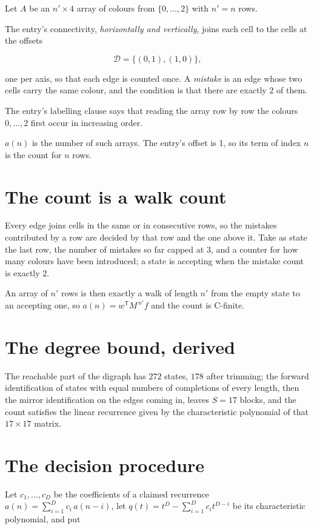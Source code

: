 \documentclass[11pt]{article}
\theoremstyle{definition}
\begin{document}
Let $A$ be an $n' \times 4$ array of colours from $\{0,\dots,2\}$ with $n' = n$ rows.

The entry's connectivity, {\itshape horizontally and vertically}, joins each cell to the cells at the offsets

\[\mathcal{D} = \{(0,1), (1,0)\},\]

one per axis, so that each edge is counted once. A {\itshape mistake} is an edge whose two cells carry the same colour, and the condition is that there are exactly $2$ of them.

The entry's labelling clause says that reading the array row by row the colours $0,\dots,2$ first occur in increasing order.

$a(n)$ is the number of such arrays. The entry's offset is 1, so its term of index $n$ is the count for $n$ rows.

\section{The count is a walk count}

Every edge joins cells in the same or in consecutive rows, so the mistakes contributed by a row are decided by that row and the one above it. Take as state the last row, the number of mistakes so far capped at $3$, and a counter for how many colours have been introduced; a state is accepting when the mistake count is exactly $2$.

An array of $n'$ rows is then exactly a walk of length $n'$ from the empty state to an accepting one, so $a(n) = w^{\mathsf T}M^{\,n'}f$ and the count is C-finite.

\section{The degree bound, derived}

The reachable part of the digraph has $272$ states, $178$ after trimming; the forward identification of states with equal numbers of completions of every length, then the mirror identification on the edges coming in, leaves $S = 17$ blocks, and the count satisfies the linear recurrence given by the characteristic polynomial of that $17\times17$ matrix.

\section{The decision procedure}

Let $c_1,\dots,c_D$ be the coefficients of a claimed recurrence $a(n) = \sum_{i=1}^{D} c_i\,a(n-i)$, let $q(t) = t^{D} - \sum_{i=1}^{D} c_i t^{D-i}$ be its characteristic polynomial, and put
\end{document}
